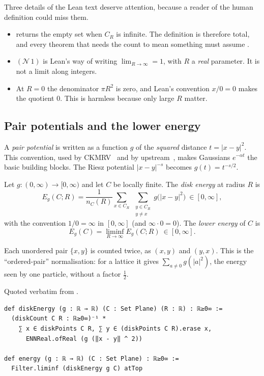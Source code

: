 Three details of the Lean text deserve attention, because a reader of the human definition could miss them.
\begin{itemize}
\item {} returns the empty set when $C_R$ is infinite. The definition is therefore total, and every
theorem that needs the count to mean something must assume .
\item {} $(\mathcal N\,1)$ is Lean's way of writing $\lim_{R\to\infty}=1$, with $R$ a \emph{real} parameter.
It is not a limit along integers.
\item At $R=0$ the denominator $\pi R^2$ is zero, and Lean's convention $x/0=0$ makes the quotient $0$. This is
harmless because only large $R$ matter.
\end{itemize}

\subsection{Pair potentials and the lower energy}

A \emph{pair potential} is written as a function $g$ of the \emph{squared} distance $t=|x-y|^2$. This convention, used by
CKMRV~\cite{ckmrv} and by upstream~\cite{oai}, makes Gaussians $e^{-\alpha t}$ the basic building blocks. The Riesz
potential $|x-y|^{-s}$ becomes $g(t)=t^{-s/2}$.

\begin{definition}\label{def:energy}
Let $g:(0,\infty)\to[0,\infty)$ and let $C$ be locally finite. The \emph{disk energy} at radius $R$ is
\[
  E_g(C;R)=\frac{1}{n_C(R)}\sum_{x\in C_R}\ \sum_{\substack{y\in C_R\\ y\ne x}} g\bigl(|x-y|^2\bigr)\ \in[0,\infty],
\]
with the convention $1/0=\infty$ in $[0,\infty]$ (and $\infty\cdot 0=0$). The \emph{lower energy} of $C$ is
\[
  E_g(C)=\liminf_{R\to\infty}E_g(C;R)\ \in[0,\infty].
\]
\end{definition}

Each unordered pair $\{x,y\}$ is counted twice, as $(x,y)$ and $(y,x)$. This is the ``ordered-pair'' normalisation:
for a lattice it gives $\sum_{a\ne0}g(|a|^2)$, the energy seen by one particle, without a factor $\tfrac12$.

\begin{leanbox}
Quoted verbatim from .
\begin{lstlisting}[language=Lean]
def diskEnergy (g : ℝ → ℝ) (C : Set Plane) (R : ℝ) : ℝ≥0∞ :=
  (diskCount C R : ℝ≥0∞)⁻¹ *
    ∑ x ∈ diskPoints C R, ∑ y ∈ (diskPoints C R).erase x,
      ENNReal.ofReal (g (‖x - y‖ ^ 2))

def energy (g : ℝ → ℝ) (C : Set Plane) : ℝ≥0∞ :=
  Filter.liminf (diskEnergy g C) atTop
\end{lstlisting}
\end{leanbox}

